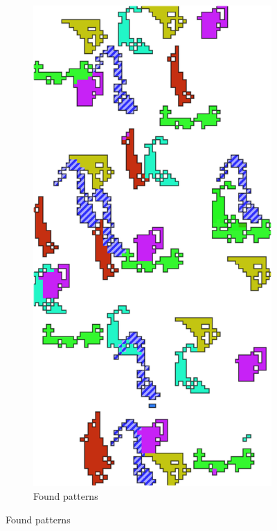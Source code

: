 \documentclass{llncs}
\begin{document}
\begin{figure}
\begin{subfigure}[t]{0.25\textwidth}
\end{subfigure}%
~
\begin{subfigure}[t]{0.25\textwidth}
\centering
\includegraphics[scale=.9]{img/exp_result_2.png}
\caption{Found patterns}
\label{fig-example1c}

\end{subfigure}
\end{figure}
\end{document}
